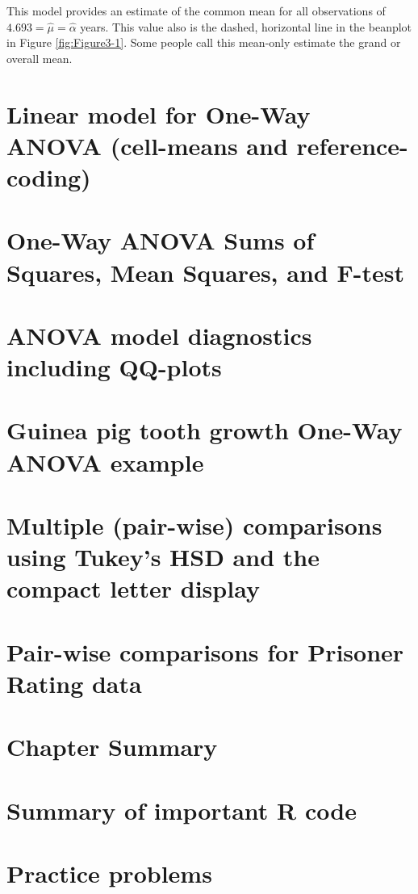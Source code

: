 \documentclass[]{book}
\begin{document}
{{This model provides an estimate of the common mean for all observations
of \(4.693 = \hat{\mu} = \hat{\alpha}\) years. This value also is the
dashed, horizontal line in the beanplot in Figure \ref{fig:Figure3-1}.
Some people call this mean-only estimate the grand or overall mean.

\section{Linear model for One-Way ANOVA (cell-means and
reference-coding)}\label{section3-2}

\section{One-Way ANOVA Sums of Squares, Mean Squares, and
F-test}\label{section3-3}

\section{ANOVA model diagnostics including QQ-plots}\label{section3-4}

\section{Guinea pig tooth growth One-Way ANOVA
example}\label{section3-5}

\section{Multiple (pair-wise) comparisons using Tukey's HSD and the
compact letter display}\label{section3-6}

\section{Pair-wise comparisons for Prisoner Rating
data}\label{section3-7}

\section{Chapter Summary}\label{section3-8}

\section{Summary of important R code}\label{section3-9}

\section{Practice problems}\label{section3-10}

}}
\end{document}
